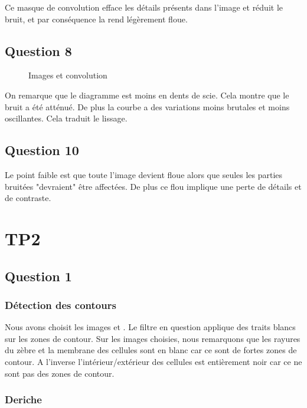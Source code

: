 \documentclass{report}
\begin{document}
			 Ce masque de convolution efface les détails présents dans l'image et réduit le bruit, et par conséquence la rend légèrement floue.
			 
		\section{Question 8}
			\begin{figure}[H]
				\begin{framed}
					\begin{minipage}{0.33\textwidth}
					\end{minipage}
					\begin{minipage}{0.33\textwidth}
					\end{minipage}
					\begin{minipage}{0.33\textwidth}
					\end{minipage}
					\caption{Images et convolution}
				\end{framed}
			\end{figure}
			
			On remarque que le diagramme est moins en dents de scie. Cela montre que le bruit a été atténué. De plus la courbe a des variations moins brutales et moins oscillantes. Cela traduit le lissage.
			
		\section{Question 10}
			Le point faible est que toute l'image devient floue alors que seules les parties bruitées "devraient" être affectées. De plus ce flou implique une perte de détails et de contraste.
			
	\chapter{TP2}
		\section{Question 1}
			\subsection{Détection des contours}
				Nous avons choisit les images  et . Le filtre en question applique des traits blancs sur les zones de contour. Sur les images choisies, nous remarquons que les rayures du zèbre et la membrane des cellules sont en blanc car ce sont de fortes zones de contour. A l'inverse l'intérieur/extérieur des cellules est entièrement noir car ce ne sont pas des zones de contour.
				
			\subsection{Deriche}
\end{document}
